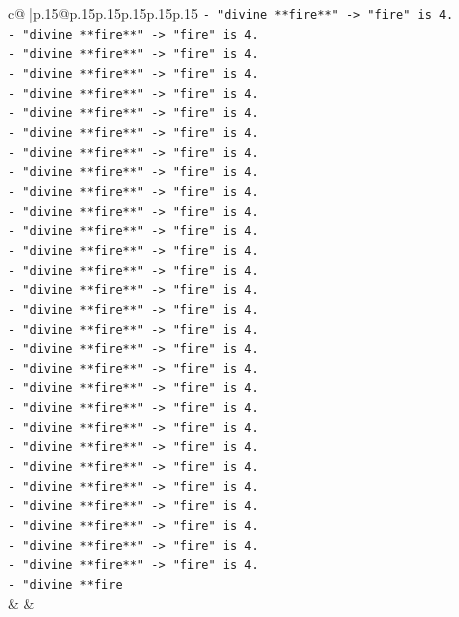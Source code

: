 \documentclass{article}
\begin{document}
{\begin{supertabular}{c@{$\;$}|p{.15\linewidth}@{}p{.15\linewidth}p{.15\linewidth}p{.15\linewidth}p{.15\linewidth}p{.15\linewidth}}
{{{\texttt{{-} "divine **fire**" {-}> "fire" is 4.} \\
\texttt{{-} "divine **fire**" {-}> "fire" is 4.} \\
\texttt{{-} "divine **fire**" {-}> "fire" is 4.} \\
\texttt{{-} "divine **fire**" {-}> "fire" is 4.} \\
\texttt{{-} "divine **fire**" {-}> "fire" is 4.} \\
\texttt{{-} "divine **fire**" {-}> "fire" is 4.} \\
\texttt{{-} "divine **fire**" {-}> "fire" is 4.} \\
\texttt{{-} "divine **fire**" {-}> "fire" is 4.} \\
\texttt{{-} "divine **fire**" {-}> "fire" is 4.} \\
\texttt{{-} "divine **fire**" {-}> "fire" is 4.} \\
\texttt{{-} "divine **fire**" {-}> "fire" is 4.} \\
\texttt{{-} "divine **fire**" {-}> "fire" is 4.} \\
\texttt{{-} "divine **fire**" {-}> "fire" is 4.} \\
\texttt{{-} "divine **fire**" {-}> "fire" is 4.} \\
\texttt{{-} "divine **fire**" {-}> "fire" is 4.} \\
\texttt{{-} "divine **fire**" {-}> "fire" is 4.} \\
\texttt{{-} "divine **fire**" {-}> "fire" is 4.} \\
\texttt{{-} "divine **fire**" {-}> "fire" is 4.} \\
\texttt{{-} "divine **fire**" {-}> "fire" is 4.} \\
\texttt{{-} "divine **fire**" {-}> "fire" is 4.} \\
\texttt{{-} "divine **fire**" {-}> "fire" is 4.} \\
\texttt{{-} "divine **fire**" {-}> "fire" is 4.} \\
\texttt{{-} "divine **fire**" {-}> "fire" is 4.} \\
\texttt{{-} "divine **fire**" {-}> "fire" is 4.} \\
\texttt{{-} "divine **fire**" {-}> "fire" is 4.} \\
\texttt{{-} "divine **fire**" {-}> "fire" is 4.} \\
\texttt{{-} "divine **fire**" {-}> "fire" is 4.} \\
\texttt{{-} "divine **fire**" {-}> "fire" is 4.} \\
\texttt{{-} "divine **fire**" {-}> "fire" is 4.} \\
\texttt{{-} "divine **fire} \\
            }
        }
    }
    & & \\ \\


\end{supertabular}}
\end{document}

